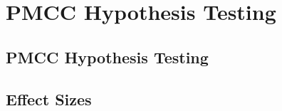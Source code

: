 \documentclass[../maths.tex]{subfiles}
\begin{document}
\chapter{PMCC Hypothesis Testing}
\section{PMCC Hypothesis Testing}
\section{Effect Sizes}
\end{document}
